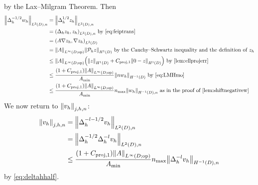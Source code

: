 \beq\label{eq:LMHmo}
 \leq {} 
\eeq
by the Lax--Milgram Theorem. Then
\begin{align}
\NLtDn{\Deltah^{-1/2}\wh} &= \NLtDn{\Deltah^{1/2} \zh}\nonumber\\
&= \IPLtDn{\Deltah \zh}{\zh} \text{ by \cref{eq:feiptrans}}\\
&= \IPLtD{A \grad \zh}{\grad \zh}\nonumber\\
&= \NLiDop{A} \NHoD{\Ph z}\nonumber\text{ by the Cauchy--Schwartz inequality and the definition of } \zh\\
&\leq \NLiDop{A}\mleft(\NHoD{z} + \Cprojfn{1}\NHoD{0 - z}\mright) \text{ by \cref{lem:ellprojerr}}\nonumber\\
&\leq \frac{\mleft(1+\Cprojfn{1}\mright)\NLiDop{A}}{\Amin}  \NHmoD{n\wh}\text{ by \cref{eq:LMHmo}}\label{eq:deltahhalf}\\
&\leq \frac{\mleft(1+\Cprojfn{1}\mright)\NLiDop{A}}{\Amin}\nmax  \NHnfn{-1}{D}{\wh}\text{ as in the proof of \cref{lem:shiftnegativew}}\nonumber
\end{align}
We now return to $\Njhn{\vh}$:
\begin{align*}
  \Nfn{j,h,n}{\vh} &= \NLtDn{\Deltah^{-l-1/2} \vh}\\
  &= \NLtDn{\Deltah^{-1/2} \Deltah^{-l} \vh}\\
&\leq \frac{\mleft(1+\Cprojfn{1}\mright)\NLiDop{A}}{\Amin}\nmax\NHnfn{-1}{D}{\Deltah^{-l}\vh}
\end{align*}
by \cref{eq:deltahhalf}.

